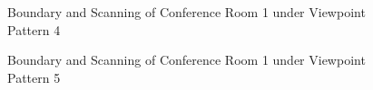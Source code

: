 \documentclass[11pt, a4paper,oneside,chapterprefix=false]{scrbook}
\begin{document}
\begin{figure}[H]
    \centering
      \label{fig:conf1 b 4} \hfill
     \label{fig:conf1 s 200 4}
    \caption{Boundary and Scanning of Conference Room 1 under Viewpoint Pattern 4}
    \label{fig:conf1 4}
\end{figure}

\begin{figure}[H]
    \centering
      \label{fig:conf1 b 5} \hfill
     \label{fig:conf1 s 5}
    \caption{Boundary and Scanning of Conference Room 1 under Viewpoint Pattern 5}
    \label{fig:conf1 5}
\end{figure}
\end{document}
